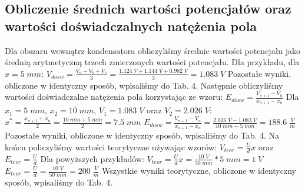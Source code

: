 \documentclass[12pt]{article}
\begin{document}
\subsection{Obliczenie średnich wartości potencjałów oraz wartości doświadczalnych natężenia pola}
Dla obszaru wewnątrz kondensatora obliczyliśmy średnie wartości potencjału jako średnią arytmetyczną trzech zmierzonych wartości potencjału. Dla przykładu, dla $x=5\;mm$: \newline \newline
{\Large $V_{dosw}=\frac{V_a+V_b+V_c}{3}=\frac{1.124\;V+1.144\;V+0.982\;V}{3}=1.083\;V$} \newline \newline
Pozostałe wyniki, obliczone w identyczny sposób, wpisaliśmy do Tab. 4. \newline 
Następnie obliczyliśmy wartości doświadczalne natężenia pola korzystając ze wzoru: \newline \newline
{\Large $E_{dosw}=\frac{V_{n+1}-V_n}{x_{n+1}-x_n}$} \newline \newline
Dla $x_1=5\;mm$, $x_2=10\;mm$, $V_1=1.083\;V$ oraz $V_2=2.026\;V$: \newline \newline
{\Large $x^*=\frac{x_{n+1}+x_n}{2}=\frac{10\;mm+5\;mm}{2}=7.5\;mm$ \newline \newline
$E_{dosw}=\frac{V_{n+1}-V_n}{x_{n+1}-x_n}=\frac{2.026\;V-1.083\;V}{10\;mm-5\;mm}=188.6\;\frac{V}{m}$} \newline \newline
Pozostałe wyniki, obliczone w identyczny sposób, wpisaliiśmy do Tab. 4. \newline
Na końcu policzyliśmy wartości teorytyczne używając wzorów: \newline \newline
{\Large $V_{teor}=\frac{U}{d}x$       oraz       $E_{teor}=\frac{U}{d}$} \newline \newline
Dla powyższych przykładów: \newline \newline
{\Large $V_{teor}=\frac{U}{d}x=\frac{10\;V}{50\;mm}*5\;mm=1\;V$ \newline \newline
$ E_{teor}=\frac{U}{d}=\frac{10\;V}{50\;mm}=200\;\frac{V}{m}$} \newline \newline
Wszystkie wyniki teorytyczne, obliczone w identyczny sposób, wpisaliśmy do Tab. 4.
\end{document}
